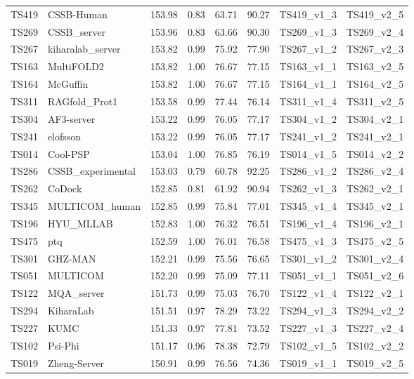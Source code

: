 \begin{table}[ht]
{\begin{tabular}{llllllll}
TS419 & CSSB-Human & 153.98 & 0.83 & 63.71 & 90.27 & TS419\_v1\_3 & TS419\_v2\_5 \\ 
TS269 & CSSB\_server & 153.96 & 0.83 & 63.66 & 90.30 & TS269\_v1\_3 & TS269\_v2\_4 \\ 
TS267 & kiharalab\_server & 153.82 & 0.99 & 75.92 & 77.90 & TS267\_v1\_2 & TS267\_v2\_3 \\ 
TS163 & MultiFOLD2 & 153.82 & 1.00 & 76.67 & 77.15 & TS163\_v1\_1 & TS163\_v2\_5 \\ 
TS164 & McGuffin & 153.82 & 1.00 & 76.67 & 77.15 & TS164\_v1\_1 & TS164\_v2\_5 \\ 
TS311 & RAGfold\_Prot1 & 153.58 & 0.99 & 77.44 & 76.14 & TS311\_v1\_4 & TS311\_v2\_5 \\ 
TS304 & AF3-server & 153.22 & 0.99 & 76.05 & 77.17 & TS304\_v1\_2 & TS304\_v2\_1 \\ 
TS241 & elofsson & 153.22 & 0.99 & 76.05 & 77.17 & TS241\_v1\_2 & TS241\_v2\_1 \\ 
TS014 & Cool-PSP & 153.04 & 1.00 & 76.85 & 76.19 & TS014\_v1\_5 & TS014\_v2\_2 \\ 
TS286 & CSSB\_experimental & 153.03 & 0.79 & 60.78 & 92.25 & TS286\_v1\_2 & TS286\_v2\_4 \\ 
TS262 & CoDock & 152.85 & 0.81 & 61.92 & 90.94 & TS262\_v1\_3 & TS262\_v2\_1 \\ 
TS345 & MULTICOM\_human & 152.85 & 0.99 & 75.84 & 77.01 & TS345\_v1\_4 & TS345\_v2\_1 \\ 
TS196 & HYU\_MLLAB & 152.83 & 1.00 & 76.32 & 76.51 & TS196\_v1\_4 & TS196\_v2\_1 \\ 
TS475 & ptq & 152.59 & 1.00 & 76.01 & 76.58 & TS475\_v1\_3 & TS475\_v2\_5 \\ 
TS301 & GHZ-MAN & 152.21 & 0.99 & 75.56 & 76.65 & TS301\_v1\_2 & TS301\_v2\_4 \\ 
TS051 & MULTICOM & 152.20 & 0.99 & 75.09 & 77.11 & TS051\_v1\_1 & TS051\_v2\_6 \\ 
TS122 & MQA\_server & 151.73 & 0.99 & 75.03 & 76.70 & TS122\_v1\_4 & TS122\_v2\_1 \\ 
TS294 & KiharaLab & 151.51 & 0.97 & 78.29 & 73.22 & TS294\_v1\_3 & TS294\_v2\_2 \\ 
TS227 & KUMC & 151.33 & 0.97 & 77.81 & 73.52 & TS227\_v1\_3 & TS227\_v2\_4 \\ 
TS102 & Psi-Phi & 151.17 & 0.96 & 78.38 & 72.79 & TS102\_v1\_5 & TS102\_v2\_2 \\ 
TS019 & Zheng-Server & 150.91 & 0.99 & 76.56 & 74.36 & TS019\_v1\_1 & TS019\_v2\_5 \\ 

\end{tabular}}
\end{table}
